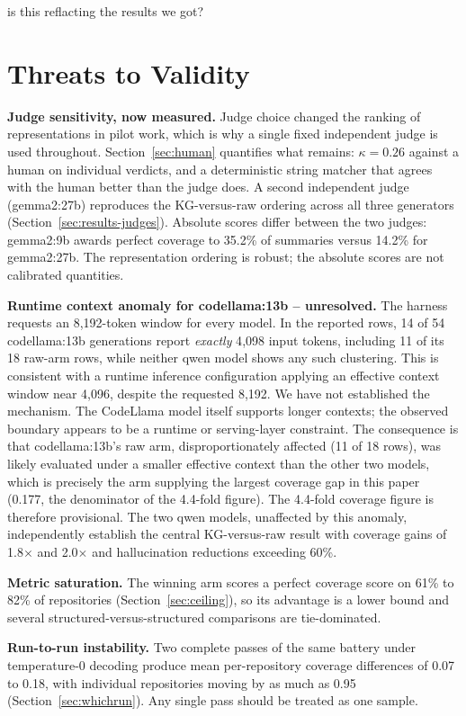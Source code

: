 is this reflacting the results we got?\documentclass[conference]{IEEEtran}
\begin{document}
\section{Threats to Validity}
\label{sec:threats}

\textbf{Judge sensitivity, now measured.} Judge choice changed the ranking of representations in
pilot work, which is why a single fixed independent judge is used throughout.
Section~\ref{sec:human} quantifies what remains: $\kappa=0.26$ against a human on individual
verdicts, and a deterministic string matcher that agrees with the human better than the judge
does. A second independent judge (gemma2:27b) reproduces the KG-versus-raw ordering across all
three generators (Section~\ref{sec:results-judges}). Absolute scores differ between the two
judges: gemma2:9b awards perfect coverage to 35.2\% of summaries versus 14.2\% for gemma2:27b.
The representation ordering is robust; the absolute scores are not calibrated quantities.

\textbf{Runtime context anomaly for codellama:13b -- unresolved.} The harness requests an
8{,}192-token window for every model. In the reported rows, 14 of 54 codellama:13b generations
report \emph{exactly} 4{,}098 input tokens, including 11 of its 18 raw-arm rows, while neither
qwen model shows any such clustering. This is consistent with a runtime inference configuration
applying an effective context window near 4{,}096, despite the requested 8{,}192. We have not
established the mechanism. The CodeLlama model itself supports longer contexts; the observed
boundary appears to be a runtime or serving-layer constraint. The consequence is that
codellama:13b's raw arm, disproportionately affected (11 of 18 rows), was likely evaluated
under a smaller effective context than the other two models, which is precisely the arm
supplying the largest coverage gap in this paper (0.177, the denominator of the 4.4-fold
figure). The 4.4-fold coverage figure is therefore provisional. The two qwen models,
unaffected by this anomaly, independently establish the central KG-versus-raw result with
coverage gains of 1.8$\times$ and 2.0$\times$ and hallucination reductions exceeding 60\%.

\textbf{Metric saturation.} The winning arm scores a perfect coverage score on 61\% to 82\% of
repositories (Section~\ref{sec:ceiling}), so its advantage is a lower bound and several
structured-versus-structured comparisons are tie-dominated.

\textbf{Run-to-run instability.} Two complete passes of the same battery under temperature-0
decoding produce mean per-repository coverage differences of 0.07 to 0.18, with individual
repositories moving by as much as 0.95 (Section~\ref{sec:whichrun}). Any single pass should be
treated as one sample.
\end{document}
